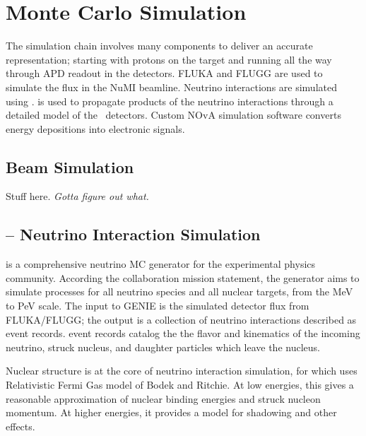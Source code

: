 \chapter{Monte Carlo Simulation}
\label{sim_chapter}


The \nova simulation chain involves many components to deliver an accurate representation; starting with protons on the \numi target and running all the way through APD readout in the \nova detectors.  FLUKA and FLUGG are used to simulate the flux in the NuMI beamline.  \cite{fluka}  Neutrino interactions are simulated using \genie. \cite{genie}  \geant is used to propagate products of the neutrino interactions through a detailed model of the \nova~detectors. \cite{geant}  Custom NOvA simulation software converts energy depositions into electronic signals.


\section{Beam Simulation}


Stuff here.  \textit{Gotta figure out what.}

\section{\genie -- Neutrino Interaction Simulation}

\genie is a comprehensive neutrino MC generator for the experimental physics community.  According the \genie collaboration mission statement, the generator aims to simulate processes  for all neutrino species and all nuclear targets, from the MeV to PeV scale.  The input to GENIE is the simulated detector flux from FLUKA/FLUGG; the output is a collection of neutrino interactions described as \genie event records.  \genie event records catalog the the flavor and kinematics of the incoming neutrino, struck nucleus, and daughter particles which leave the nucleus.

Nuclear structure is at the core of neutrino interaction simulation, for which \genie uses  Relativistic Fermi Gas model of Bodek and Ritchie.  \cite{bodekritchie}  At low energies, this gives a reasonable approximation of nuclear binding energies and struck nucleon momentum.  At higher energies, it provides a model for shadowing and other effects.

